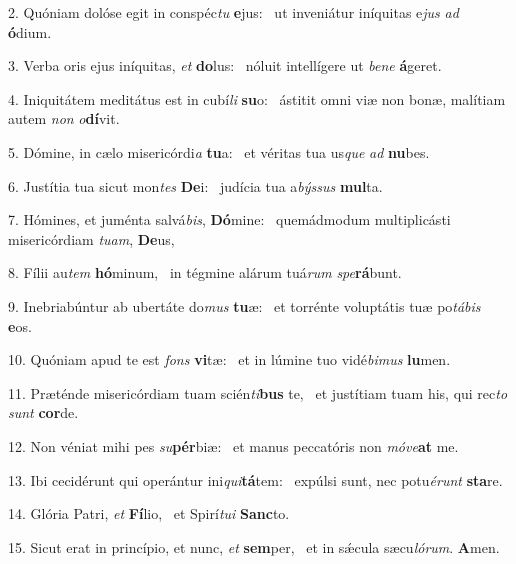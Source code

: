 2. Quóniam dolóse egit in conspéc\textit{tu} \textbf{e}jus: \ast\  ut inveniátur iníquitas e\textit{jus} \textit{ad} \textbf{ó}dium.\

3. Verba oris ejus iníquitas, \textit{et} \textbf{do}lus: \ast\  nóluit intellígere ut \textit{be}\textit{ne} \textbf{á}geret.\

4. Iniquitátem meditátus est in cubí\textit{li} \textbf{su}o: \ast\  ástitit omni viæ non bonæ, malítiam autem \textit{non} \textit{o}\textbf{dí}vit.\

5. Dómine, in cælo misericórdi\textit{a} \textbf{tu}a: \ast\  et véritas tua us\textit{que} \textit{ad} \textbf{nu}bes.\

6. Justítia tua sicut mon\textit{tes} \textbf{De}i: \ast\  judícia tua a\textit{býs}\textit{sus} \textbf{mul}ta.\

7. Hómines, et juménta salvá\textit{bis}, \textbf{Dó}mine: \ast\  quemádmodum multiplicásti misericórdiam \textit{tu}\textit{am}, \textbf{De}us,\

8. Fílii au\textit{tem} \textbf{hó}minum, \ast\  in tégmine alárum tuá\textit{rum} \textit{spe}\textbf{rá}bunt.\

9. Inebriabúntur ab ubertáte do\textit{mus} \textbf{tu}æ: \ast\  et torrénte voluptátis tuæ po\textit{tá}\textit{bis} \textbf{e}os.\

10. Quóniam apud te est \textit{fons} \textbf{vi}tæ: \ast\  et in lúmine tuo vidé\textit{bi}\textit{mus} \textbf{lu}men.\

11. Præténde misericórdiam tuam scién\textit{ti}\textbf{bus} te, \ast\  et justítiam tuam his, qui rec\textit{to} \textit{sunt} \textbf{cor}de.\

12. Non véniat mihi pes \textit{su}\textbf{pér}biæ: \ast\  et manus peccatóris non \textit{mó}\textit{ve}\textbf{at} me.\

13. Ibi cecidérunt qui operántur ini\textit{qui}\textbf{tá}tem: \ast\  expúlsi sunt, nec potu\textit{é}\textit{runt} \textbf{sta}re.\

14. Glória Patri, \textit{et} \textbf{Fí}lio, \ast\  et Spirí\textit{tu}\textit{i} \textbf{Sanc}to.\

15. Sicut erat in princípio, et nunc, \textit{et} \textbf{sem}per, \ast\  et in sǽcula sæcu\textit{ló}\textit{rum}. \textbf{A}men.\

